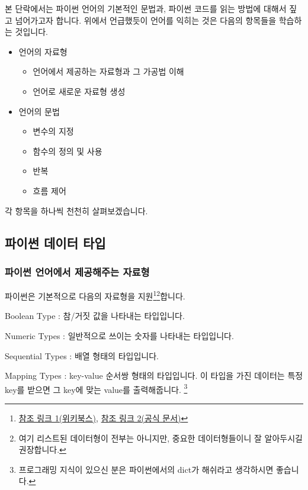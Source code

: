 \documentclass[twoside]{article}
\begin{document}



본 단락에서는 파이썬 언어의 기본적인 문법과, 파이썬 코드를 읽는 방법에 대해서 짚고 넘어가고자 합니다. 위에서 언급했듯이 언어를 익히는 것은 다음의 항목들을 학습하는 것입니다. 

\begin{itemize} 
\item 언어의 자료형 
\begin{itemize}
\item 언어에서 제공하는 자료형과 그 가공법 이해 
\item 언어로 새로운 자료형 생성
\end{itemize} 
\item 언어의 문법 
\begin{itemize} 
\item 변수의 지정 
\item 함수의 정의 및 사용 
\item 반복 
\item 흐름 제어
\end{itemize}
\end{itemize}

각 항목을 하나씩 천천히 살펴보겠습니다. 

\subsection{파이썬 데이터 타입} 

\subsubsection{파이썬 언어에서 제공해주는 자료형} 

파이썬은 기본적으로 다음의 자료형을 지원\footnote{\href{https://en.wikibooks.org/wiki/Python\_Programming/Data\_Types}{참조 링크 1(위키북스)}, \href{https://docs.python.org/3/library/stdtypes.html}{참조 링크 2(공식 문서)}}\footnote{여기 리스트된 데이터형이 전부는 아니지만, 중요한 데이터형들이니 잘 알아두시길 권장합니다.}합니다. 

\begin{compactitem} 
\item Boolean Type : 참/거짓 값을 나타내는 타입입니다. 
\item Numeric Types : 일반적으로 쓰이는 숫자를 나타내는 타입입니다. 
\item Sequential Types : 배열 형태의 타입입니다. 
\item Mapping Types : key-value 순서쌍 형태의 타입입니다. 이 타입을 가진 데이터는 특정 key를 받으면 그 key에 맞는 value를 출력해줍니다. \footnote{프로그래밍 지식이 있으신 분은 파이썬에서의 dict가 해쉬라고 생각하시면 좋습니다.}
\end{compactitem}
\end{document}
